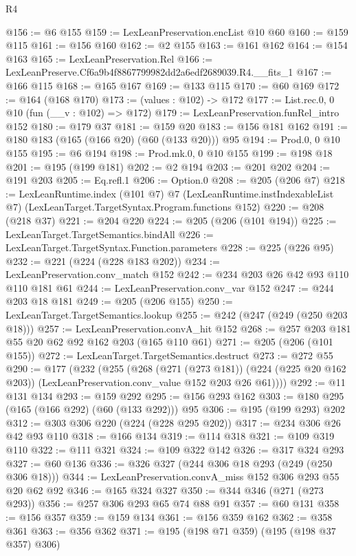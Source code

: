 \begin{lexlean}{R4}
\begin{coremodule}
@156 := @6 @155
@159 := LexLeanPreservation.encList @10 @60
@160 := @159 @115
@161 := @156 @160
@162 := @2 @155
@163 := @161 @162
@164 := @154 @163
@165 := LexLeanPreservation.Rel
@166 := LexLeanPreserve.Cf6a9b4f8867799982dd2a6edf2689039.R4.__fits_1
@167 := @166 @115
@168 := @165 @167
@169 := @133 @115
@170 := @60 @169
@172 := @164 (@168 @170)
@173 := (values : @102) -> @172
@177 := List.rec.{0, 0} @10 (fun (__v : @102) => @172)
@179 := LexLeanPreservation.funRel_intro @152
@180 := @179 @37
@181 := @159 @20
@183 := @156 @181 @162
@191 := @180 @183 (@165 (@166 @20) (@60 (@133 @20))) @95
@194 := Prod.{0, 0} @10 @155
@195 := @6 @194
@198 := Prod.mk.{0, 0} @10 @155
@199 := @198 @18
@201 := @195 (@199 @181)
@202 := @2 @194
@203 := @201 @202
@204 := @191 @203
@205 := Eq.refl.{1}
@206 := Option.{0}
@208 := @205 (@206 @7)
@218 := LexLeanRuntime.index
    (@101 @7)
    @7
    (LexLeanRuntime.instIndexableList @7)
    (LexLeanTarget.TargetSyntax.Program.functions @152)
@220 := @208 (@218 @37)
@221 := @204 @220
@224 := @205 (@206 (@101 @194))
@225 := LexLeanTarget.TargetSemantics.bindAll
@226 := LexLeanTarget.TargetSyntax.Function.parameters
@228 := @225 (@226 @95)
@232 := @221 (@224 (@228 @183 @202))
@234 := LexLeanPreservation.conv_match @152
@242 := @234 @203 @26 @42 @93 @110 @110 @181 @61
@244 := LexLeanPreservation.conv_var @152
@247 := @244 @203 @18 @181
@249 := @205 (@206 @155)
@250 := LexLeanTarget.TargetSemantics.lookup
@255 := @242 (@247 (@249 (@250 @203 @18)))
@257 := LexLeanPreservation.convA_hit @152
@268 := @257 @203 @181 @55 @20 @62 @92 @162 @203 (@165 @110 @61)
@271 := @205 (@206 (@101 @155))
@272 := LexLeanTarget.TargetSemantics.destruct
@273 := @272 @55
@290 := @177
    (@232
      (@255
        (@268
          (@271 (@273 @181))
          (@224 (@225 @20 @162 @203))
          (LexLeanPreservation.conv_value @152 @203 @26 @61))))
@292 := @11 @131 @134
@293 := @159 @292
@295 := @156 @293 @162
@303 := @180 @295 (@165 (@166 @292) (@60 (@133 @292))) @95
@306 := @195 (@199 @293) @202
@312 := @303 @306 @220 (@224 (@228 @295 @202))
@317 := @234 @306 @26 @42 @93 @110
@318 := @166 @134
@319 := @114 @318
@321 := @109 @319 @110
@322 := @111 @321
@324 := @109 @322 @142
@326 := @317 @324 @293
@327 := @60 @136
@336 := @326 @327 (@244 @306 @18 @293 (@249 (@250 @306 @18)))
@344 := LexLeanPreservation.convA_miss @152 @306 @293 @55 @20 @62 @92
@346 := @165 @324 @327
@350 := @344 @346 (@271 (@273 @293))
@356 := @257 @306 @293 @65 @74 @88 @91
@357 := @60 @131
@358 := @156 @357
@359 := @159 @134
@361 := @156 @359 @162
@362 := @358 @361
@363 := @356 @362
@371 := @195 (@198 @71 @359) (@195 (@198 @37 @357) @306)

\end{coremodule}
\end{lexlean}
